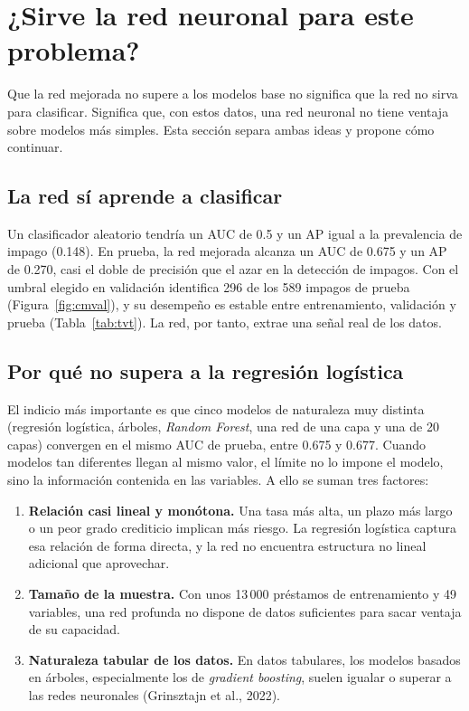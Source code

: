 \documentclass[12pt,a4paper]{article}
\begin{document}
\section{¿Sirve la red neuronal para este problema?}\label{sec:sirve}

Que la red mejorada no supere a los modelos base no significa que la red no sirva para clasificar. Significa que, con estos datos, una red neuronal no tiene ventaja sobre modelos más simples. Esta sección separa ambas ideas y propone cómo continuar.

\subsection{La red sí aprende a clasificar}

Un clasificador aleatorio tendría un AUC de 0.5 y un AP igual a la prevalencia de impago (0.148). En prueba, la red mejorada alcanza un AUC de 0.675 y un AP de 0.270, casi el doble de precisión que el azar en la detección de impagos. Con el umbral elegido en validación identifica 296 de los 589 impagos de prueba (Figura~\ref{fig:cmval}), y su desempeño es estable entre entrenamiento, validación y prueba (Tabla~\ref{tab:tvt}). La red, por tanto, extrae una señal real de los datos.

\subsection{Por qué no supera a la regresión logística}

El indicio más importante es que cinco modelos de naturaleza muy distinta (regresión logística, árboles, \textit{Random Forest}, una red de una capa y una de 20 capas) convergen en el mismo AUC de prueba, entre 0.675 y 0.677. Cuando modelos tan diferentes llegan al mismo valor, el límite no lo impone el modelo, sino la información contenida en las variables. A ello se suman tres factores:

\begin{enumerate}
\item \textbf{Relación casi lineal y monótona.} Una tasa más alta, un plazo más largo o un peor grado crediticio implican más riesgo. La regresión logística captura esa relación de forma directa, y la red no encuentra estructura no lineal adicional que aprovechar.
\item \textbf{Tamaño de la muestra.} Con unos 13\,000 préstamos de entrenamiento y 49 variables, una red profunda no dispone de datos suficientes para sacar ventaja de su capacidad.
\item \textbf{Naturaleza tabular de los datos.} En datos tabulares, los modelos basados en árboles, especialmente los de \textit{gradient boosting}, suelen igualar o superar a las redes neuronales (Grinsztajn et al., 2022).
\end{enumerate}
\end{document}
